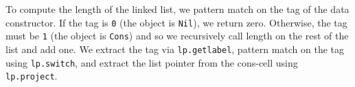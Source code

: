 \documentclass[conference]{IEEEtran}
\newcommand{\lpswitch}{\textcolor{pairedTwoDarkBlue}{\texttt{lp.switch}}}
\newcommand{\lpconstruct}{\textcolor{pairedTwoDarkBlue}{\texttt{lp.construct}}}
\newcommand{\lpgetlabel}{\textcolor{pairedTwoDarkBlue}{\texttt{lp.getlabel}}}
\newcommand{\lpproject}{\textcolor{pairedTwoDarkBlue}{\texttt{lp.project}}}
\begin{document}
To compute the length of the linked list, we pattern match on the
tag of the data constructor. If the tag is \texttt{0} (the object is
\texttt{Nil}), we return zero. Otherwise, the tag must be \texttt{1} (the object is \texttt{Cons}) and so we recursively call length on the
rest of the list and add one. We extract the tag via \lpgetlabel{},
pattern match on the tag using \lpswitch{}, and extract the list pointer
from the cons-cell using  \lpproject{}.



%
%
%
%
%
\end{document}
